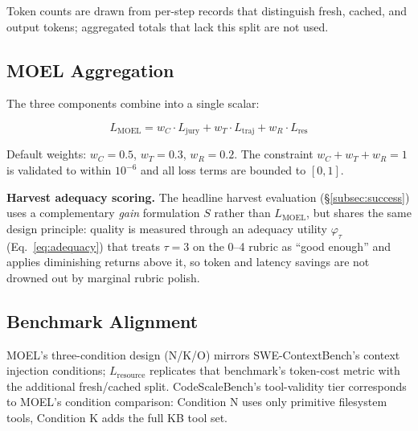 Token counts are drawn from per-step records that distinguish fresh, cached,
and output tokens; aggregated totals that lack this split are not used.

\subsection{MOEL Aggregation}

The three components combine into a single scalar:

\begin{equation}
L_\text{MOEL} = w_C \cdot L_\text{jury} + w_T \cdot L_\text{traj} + w_R \cdot L_\text{res}
\label{eq:lmoel}
\end{equation}

Default weights: $w_C = 0.5$, $w_T = 0.3$, $w_R = 0.2$.  The
constraint $w_C + w_T + w_R = 1$ is validated to within $10^{-6}$ and all
loss terms are bounded to $[0, 1]$.

\medskip
\noindent\textbf{Harvest adequacy scoring.}  The headline harvest evaluation
(\S\ref{subsec:success}) uses a complementary \emph{gain} formulation $S$ rather
than $L_\text{MOEL}$, but shares the same design principle: quality is measured
through an adequacy utility $\varphi_\tau$ (Eq.~\ref{eq:adequacy}) that treats
$\tau{=}3$ on the 0--4 rubric as ``good enough'' and applies diminishing
returns above it, so token and latency savings are not drowned out by marginal
rubric polish.

\subsection{Benchmark Alignment}

MOEL's three-condition design (N/K/O) mirrors SWE-ContextBench's context
injection conditions; $L_\text{resource}$ replicates that benchmark's
token-cost metric with the additional fresh/cached split.
CodeScaleBench's tool-validity tier corresponds to MOEL's condition comparison:
Condition N uses only primitive filesystem tools, Condition K adds the full KB
tool set.

